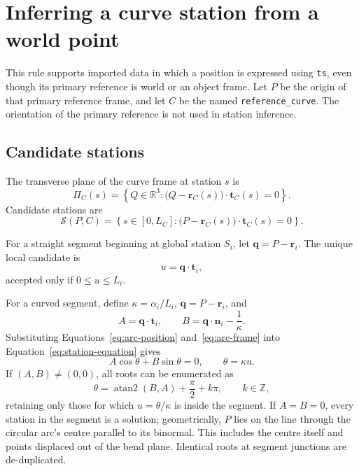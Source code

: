 \documentclass[11pt,a4paper]{article}
\newcommand{\R}{\mathbb{R}}
\begin{document}
\section{Inferring a curve station from a world point}
\label{sec:s-inference}

This rule supports imported data in which a position is expressed using
\texttt{ts}, even though its primary reference is world or an object frame.
Let $P$ be the origin of that primary reference frame, and let $C$ be the named
\texttt{reference\_curve}.  The orientation of the primary reference is not
used in station inference.

\subsection{Candidate stations}

The transverse plane of the curve frame at station $s$ is
\begin{equation}
  \Pi_C(s)=
  \left\{Q\in\R^3:\big(Q-\mathbf{r}_C(s)\big)
  \cdot\mathbf{t}_C(s)=0\right\}.
\end{equation}
Candidate stations are
\begin{equation}
  \mathcal{S}(P,C)=
  \left\{s\in[0,L_C]:
  \big(P-\mathbf{r}_C(s)\big)\cdot\mathbf{t}_C(s)=0\right\}.
  \label{eq:station-equation}
\end{equation}

For a straight segment beginning at global station $S_i$, let
$\mathbf{q}=P-\mathbf{r}_i$.  The unique local candidate is
\begin{equation}
  u=\mathbf{q}\cdot\mathbf{t}_i,
  \label{eq:straight-station-root}
\end{equation}
accepted only if $0\le u\le L_i$.

For a curved segment, define $\kappa=\alpha_i/L_i$,
$\mathbf{q}=P-\mathbf{r}_i$, and
\begin{equation}
  A=\mathbf{q}\cdot\mathbf{t}_i,
  \qquad
  B=\mathbf{q}\cdot\mathbf{n}_i-\frac{1}{\kappa}.
\end{equation}
Substituting Equations~\eqref{eq:arc-position} and~\eqref{eq:arc-frame} into
Equation~\eqref{eq:station-equation} gives
\begin{equation}
  A\cos\theta+B\sin\theta=0,
  \qquad \theta=\kappa u.
  \label{eq:arc-station-root}
\end{equation}
If $(A,B)\ne(0,0)$, all roots can be enumerated as
\begin{equation}
  \theta=\operatorname{atan2}(B,A)+\frac{\pi}{2}+k\pi,
  \qquad k\in\mathbb{Z},
  \label{eq:arc-root-enumeration}
\end{equation}
retaining only those for which $u=\theta/\kappa$ is inside the segment.  If
$A=B=0$, every station in the segment is a solution; geometrically, $P$ lies
on the line through the circular arc's centre parallel to its binormal. This
includes the centre itself and points displaced out of the bend plane.
Identical roots at segment junctions are
de-duplicated.
\end{document}
